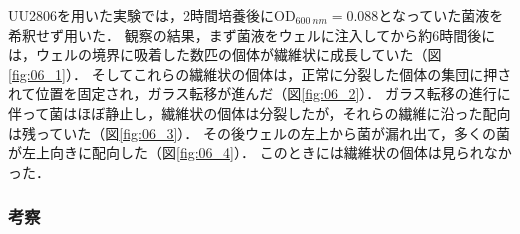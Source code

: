\documentclass[a4paper,11pt,titlepage]{jsarticle}
\begin{document}
UU2806を用いた実験では，2時間培養後に$\mathrm{OD}_{\SI{600}{nm}}=0.088$となっていた菌液を希釈せず用いた．
観察の結果，まず菌液をウェルに注入してから約6時間後には，ウェルの境界に吸着した数匹の個体が繊維状に成長していた（図\ref{fig:06_1}）．
そしてこれらの繊維状の個体は，正常に分裂した個体の集団に押されて位置を固定され，ガラス転移が進んだ（図\ref{fig:06_2}）．
ガラス転移の進行に伴って菌はほぼ静止し，繊維状の個体は分裂したが，それらの繊維に沿った配向は残っていた（図\ref{fig:06_3}）．
その後ウェルの左上から菌が漏れ出て，多くの菌が左上向きに配向した（図\ref{fig:06_4}）．
このときには繊維状の個体は見られなかった．

\subsubsection{考察}
\end{document}

